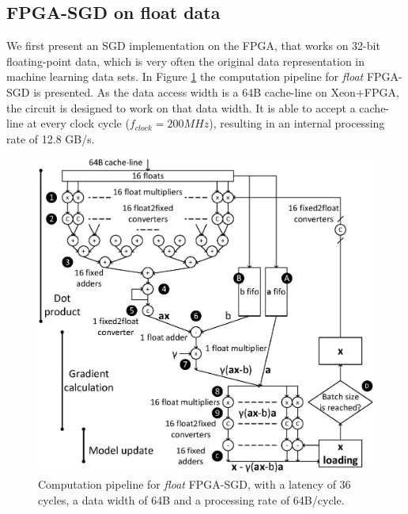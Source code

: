\documentclass{article}
\begin{document}
\subsection{FPGA-SGD on \textbf{float} data}
\label{section:floatfpgasgd}

We first present an SGD implementation on the FPGA, that works on 32-bit floating-point data, which is very often the original data representation in machine learning data sets. In Figure \ref{fig:floatFPGASGD} the computation pipeline for \textit{float} FPGA-SGD is presented. As the data access width is a 64B cache-line on Xeon+FPGA, the circuit is designed to work on that data width. It is able to accept a cache-line at every clock cycle ($f_{clock} = 200 MHz$), resulting in an internal processing rate of 12.8 GB/s.

\begin{figure}[t]
\centering
\includegraphics[width=.8\columnwidth]{Figures/floatFPGASGD.eps}
\caption{Computation pipeline for \textit{float} FPGA-SGD, with a latency of 36 cycles, a data width of 64B and a processing rate of 64B/cycle.}
\label{fig:floatFPGASGD}
\end{figure}
\end{document}
